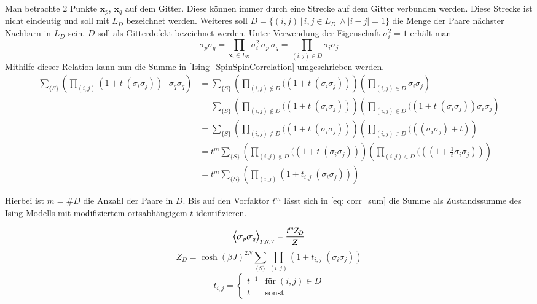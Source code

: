 \noindent Man betrachte 2 Punkte $\bm{x}_p$, $\bm{x}_q$ auf dem Gitter. Diese können immer durch eine Strecke auf dem Gitter verbunden werden. Diese Strecke ist nicht eindeutig und soll mit $L_D$ bezeichnet werden. Weiteres soll $D = \{ (i,j) \,|\, i,j \in L_D\ \wedge |i-j| = 1 \}$ die Menge der Paare nächster Nachbarn in $L_D$ sein. $D$ soll als Gitterdefekt bezeichnet werden. Unter Verwendung der Eigenschaft $\sigma_{i}^{2} = 1$ erhält man
\begin{equation} \label{eq: spin_spin_prod}
\sigma_{p} \sigma_{q} = \prod_{\bm{x}_i \in L_D} \sigma_{i}^{2} \,\sigma_{p}\,\sigma_{q} = \prod_{(i,j) \in D} \sigma_{i}\sigma_{j} 
\end{equation}
Mithilfe dieser Relation kann nun die Summe in \eqref{Ising_SpinSpinCorrelation} umgeschrieben werden. 
\begin{align} 
 \sum_{\{S\}} \left(\prod_{(i,j)} (1 +  t \; (\sigma_i \sigma_j))\textbf{ }\sigma_{q} \sigma_{q}\right) 
  & = \sum_{\{S\}} \left(\prod_{(i,j) \notin D } ((1 +  t \; (\sigma_i \sigma_j))\right) \left(\prod_{(i,j) \in D} \sigma_i \sigma_j\right) \nonumber \\
  & = \sum_{\{S\}} \left(\prod_{(i,j) \notin D} ((1 +  t \; (\sigma_i \sigma_j))\right) \left(\prod_{(i,j) \in D} ((1 +  t \; (\sigma_i \sigma_j))\sigma_i \sigma_j \right) \nonumber\\
  & = \sum_{\{S\}} \left(\prod_{(i,j) \notin D} ((1 +  t \; (\sigma_i \sigma_j))\right) \left(\prod_{(i,j) \in D} (((\sigma_i \sigma_j) +  t)\right)  \nonumber\\
  & = t^m \sum_{\{S\}} \left(\prod_{(i,j) \notin D} ((1 +  t \; (\sigma_i \sigma_j))\right) \left(\prod_{(i,j) \in D} (((1 + \frac{1}{t}\sigma_i \sigma_j))\right) \nonumber\\
  &= t^m \sum_{\{S\}} \left(\prod_{(i,j)} (1 + t_{i,j} \; (\sigma_i \sigma_j)) \right) \label{eq: corr_sum}
\end{align}

\noindent Hierbei ist $m = \#D$ die Anzahl der Paare in $D$. Bis auf den Vorfaktor $t^m$ lässt sich in \eqref{eq: corr_sum} die Summe als Zustandssumme des Ising-Modells mit modifiziertem ortsabhängigem $t$ identifizieren.

\begin{grayframe}[frametitle = {Spin Korrelation als Zustandsumme auf defektem Gitter}]
\begin{equation}
\left\langle \sigma_{p} \sigma_{q}  \right\rangle_{T,N,V} = \frac{t^m Z_D}{Z}
\end{equation}
\begin{equation} \label{eq: Defekte Zustanssumme}
Z_D = \cosh(\beta J)^{2N} \sum_{\{S\}} \prod_{(i,j)} (1 +  t_{i,j} \; (\sigma_i \sigma_j)) 
\end{equation}
\begin{equation} \nonumber
t_{i,j} = \left\{\begin{array}{ll} t^{-1} & \text{für}\; (i,j)\in D \\
          t & \text{sonst} \end{array} \right.
\end{equation}
\end{grayframe}

